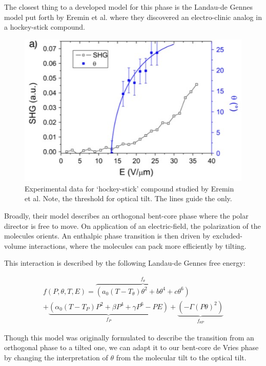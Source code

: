 \documentclass[aagreenthesis]{subfiles}
\begin{document}
The closest thing to a developed model for this phase is the Landau-de Gennes
model put forth by Eremin et al.\cite{eremin2008electrically} where they
discovered an electro-clinic analog in a hockey-stick compound. 
\begin{figure}
    \centering
    \includegraphics[width=\textwidth]{./figs/pal30/fromPapers/tiltVfield.jpg}
    \caption{\label{fig:achiralTilt} Experimental data for `hockey-stick'
    compound studied by Eremin et al.\cite{eremin2008electrically} Note, the threshold for optical tilt. The lines guide the only.}
\end{figure}
Broadly, their model describes an orthogonal bent-core phase where the polar
director is free to move. On application of an electric-field, the polarization
of the molecules orients. An enthalpic phase transition
is then driven by excluded-volume interactions, where the molecules can pack
more efficiently by tilting. 

This interaction is described by the following Landau-de Gennes free energy:

\begin{multline}
    f(P,\theta,T,E) = \overbrace{\left(a_0(T-T_\theta)\theta^2+b\theta^4+c\theta^6
    \right)}^{f_\theta}\\
    + \underbrace{\left( \alpha_0(T-T_P)P^2+\beta P^4 + \gamma P^6 -PE
            \right)}_{f_P} +\underbrace{\left(
    -\Gamma (P \theta)^2 \right)}_{f_{\theta P}}
\end{multline}

Though this model was originally formulated to describe the transition from an
orthogonal phase to a tilted one, we can adapt it to our bent-core de Vries
phase by changing the interpretation of $\theta$ from the molecular tilt to the
optical tilt.
\end{document}
